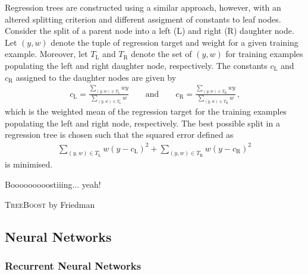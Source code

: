 Regression trees are constructed using a similar approach, however, with an
altered splitting criterion and different assigment of constants to leaf
nodes. Consider the split of a parent node into a left (L) and right (R)
daughter node. Let $(y, w)$ denote the tuple of regression target and weight for
a given training example. Moreover, let $T_{\text{L}}$ and $T_{\text{R}}$ denote
the set of $(y, w)$ for training examples populating the left and right daughter
node, respectively. The constants $c_{\text{L}}$ and $c_{\text{R}}$ assigned to
the daughter nodes are given by
\begin{align*}
  c_{\text{L}} = \frac{\sum_{(y, w) \in T_{\text{L}}} w y}{\sum_{(y, w) \in T_{\text{L}}} w} \qquad \text{and} \qquad c_{\text{R}} = \frac{\sum_{(y, w) \in T_{\text{R}}} w y}{\sum_{(y, w) \in T_{\text{R}}} w} \,\text{,}
\end{align*}
which is the weighted mean of the regression target for the training examples
populating the left and right node, respectively. The best possible split in a
regression tree is chosen such that the squared error defined as
\begin{align*}
  \sum_{(y, w) \in T_{\text{L}}} w (y - c_{\text{L}})^2 + \sum_{(y, w) \in T_{\text{R}} } w (y - c_{\text{R}})^2
\end{align*}
is minimised.






Booooooooostiiing... yeah!



\textsc{TreeBoost} by Friedman~\cite{Friedman:2001wbq}


\subsection{Neural Networks}

\subsubsection{Recurrent Neural Networks}%
\label{sec:rnn}


